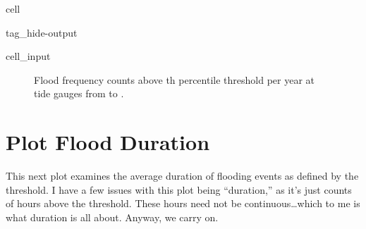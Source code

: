 \documentclass[letterpaper,10pt,english]{jupyterBook}
\begin{document}
\begin{sphinxuseclass}{cell}
\begin{sphinxuseclass}{tag_hide-output}
\begin{sphinxVerbatimInput}
\begin{sphinxuseclass}{cell_input}
\begin{sphinxVerbatim}[commandchars=\\\{\}]

  

   
\end{sphinxVerbatim}

\end{sphinxuseclass}\end{sphinxVerbatimInput}

\end{sphinxuseclass}
\end{sphinxuseclass}
\begin{figure}[htbp]
\centering
\capstart

\noindent{}
\caption{Flood frequency counts above th percentile threshold per year at  tide gauges from  to .}\label{\detokenize{notebooks/FloodFrequency:fig-threshold-counts}}\end{figure}


\chapter{Plot Flood Duration}
\label{\detokenize{notebooks/FloodFrequency:plot-flood-duration}}
\sphinxAtStartPar
This next plot examines the average duration of flooding events as defined by the threshold.
I have a few issues with this plot being “duration,” as it’s just counts of hours above the threshold. These hours need not be continuous…which to me is what duration is all about. Anyway, we carry on.
\end{document}
